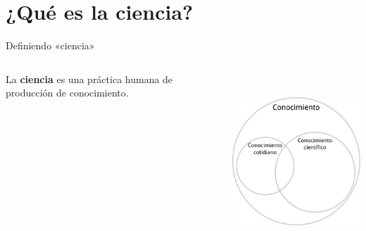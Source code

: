 \documentclass[%
            9pt,
                spanish, %
                    ignorenonframetext,
                aspectratio=169, %
        ]{beamer}
\begin{document}
\section{¿Qué es la ciencia?}\label{quuxe9-es-la-ciencia}

\begin{frame}{Definiendo «ciencia»}
\protect{}\label{definiendo-ciencia}
\begin{columns}[c,onlytextwidth]
\begin{column}{0.48\linewidth}
La \textbf{ciencia} es una práctica humana de producción de
conocimiento.
\end{column}

\begin{column}{0.48\linewidth}
\begin{center}
\includegraphics[height=18em]{venn.pdf}
\end{center}
\end{column}
\end{columns}
\end{frame}
\end{document}
